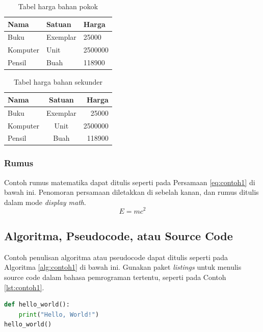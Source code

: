 \documentclass[12pt,a4paper,oneside]{book}
\begin{document}
\begin{table}[t] %
\centering
	\begin{tabular}{ | p{2cm} | p{2cm} | p{3cm} |}
	\hline
	Nama 	& Satuan 		& Harga \\
	\hline
	Buku 	& Exemplar	& 25000 \\
	Komputer	& Unit		& 2500000 \\
	Pensil	& Buah		& 118900 \\
	\hline
	\end{tabular}
\caption{Tabel harga bahan pokok}
\label{tbl:harga1}
\end{table}

\begin{table}[h] %
\centering
	\begin{tabular}{ | l | c | r | }
	\hline
	Nama 	& Satuan 		& Harga \\
	\hline
	Buku 	& Exemplar	& 25000 \\
	Komputer	& Unit		& 2500000 \\
	Pensil	& Buah		& 118900 \\
	\hline
	\end{tabular}
\caption{Tabel harga bahan sekunder}
\label{tbl:harga2}
\end{table}

\subsubsection{Rumus}
Contoh rumus matematika dapat ditulis seperti pada Persamaan \ref{eq:contoh1} di bawah ini. 
Penomoran persamaan diletakkan di sebelah kanan, dan rumus ditulis dalam mode \textit{display math}.
\begin{equation}
E = mc^2
\label{eq:contoh1}
\end{equation}

\subsection{Algoritma, Pseudocode, atau Source Code}
Contoh penulisan algoritma atau pseudocode dapat ditulis seperti pada Algoritma \ref{alg:contoh1} di bawah ini. 
Gunakan paket \textit{listings} untuk menulis source code dalam bahasa pemrograman tertentu, seperti pada Contoh \ref{lst:contoh1}. 


\begin{lstlisting}[language=Python, frame=single, caption={Contoh source code Python}, label={lst:contoh1}]
def hello_world():
    print("Hello, World!")       
hello_world()
\end{lstlisting}
\end{document}

